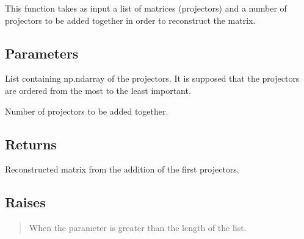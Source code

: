 \documentclass[letterpaper,10pt,english]{sphinxmanual}
\begin{document}
\begin{fulllineitems}
\label{\detokenize{index:hicanalysis.preprocessing.reconstruct_matrix}}
\pysigstartsignatures
{}
\pysigstopsignatures
\sphinxAtStartPar
This function takes as input a list of matrices (projectors) and a number of projectors to be added
together in order to reconstruct the matrix.


\subsection{Parameters}
\label{\detokenize{index:id11}}\begin{description}
\sphinxAtStartPar
List containing np.ndarray of the projectors. It is supposed that the projectors are ordered 
from the most to the least important.

\sphinxAtStartPar
Number of projectors to be added together.

\end{description}


\subsection{Returns}
\label{\detokenize{index:id12}}\begin{description}
\sphinxAtStartPar
Reconstructed matrix from the addition of the first  projectors.

\end{description}


\subsection{Raises}
\label{\detokenize{index:raises}}\begin{quote}
\begin{description}
\sphinxAtStartPar
When the  parameter is greater than the length of the  list.

\end{description}
\end{quote}

\end{fulllineitems}
\end{document}
